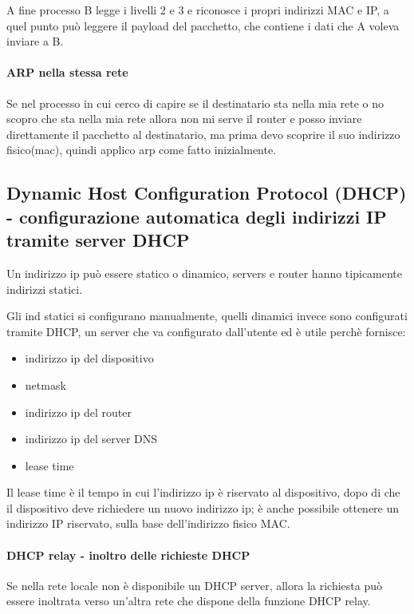 A fine processo B legge i livelli 2 e 3 e riconosce i propri indirizzi MAC e IP, a quel punto può leggere il payload del pacchetto, che contiene i dati che A voleva inviare a B.

\paragraph{ARP nella stessa rete}
Se nel processo in cui cerco di capire se il destinatario sta nella mia rete o no scopro che sta nella mia rete allora non mi serve il router e posso inviare direttamente il pacchetto al destinatario, ma prima devo scoprire il suo indirizzo fisico(mac), quindi applico arp come fatto inizialmente.

\newpage
\subsection{Dynamic Host Configuration Protocol (DHCP) - configurazione automatica degli indirizzi IP tramite server DHCP}

 Un indirizzo ip può essere statico o dinamico, servers e router hanno tipicamente indirizzi statici.

Gli ind statici si configurano manualmente, quelli dinamici invece sono configurati tramite DHCP, un server che va configurato dall'utente ed è utile perchè fornisce: 
\begin{multicols}{3}
\begin{itemize}
    \item indirizzo ip del dispositivo
    \item netmask
    \item indirizzo ip del router
    \item indirizzo ip del server DNS
    \item lease time
\end{itemize}
\end{multicols}
Il lease time è il tempo in cui l'indirizzo ip è riservato al dispositivo, dopo di che il dispositivo deve richiedere un nuovo indirizzo ip;
è anche possibile ottenere un indirizzo IP riservato, sulla base dell'indirizzo fisico MAC.

\paragraph{DHCP relay - inoltro delle richieste DHCP}
Se nella rete locale non è disponibile un DHCP server, allora la richiesta può essere inoltrata  verso un'altra rete che dispone della funzione DHCP relay.

